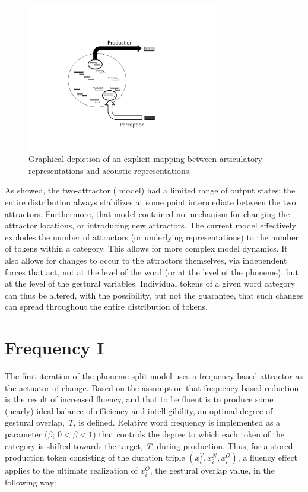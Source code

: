 \begin{figure}[H]

\includegraphics[width=0.75\textwidth]{figures/SeparateReps.pdf}\caption{\label{fig:P-toP-mapping}Graphical depiction of an explicit mapping
between articulatory representations and acoustic representations. }

\end{figure}

As  showed, the two-attractor (
model) had a limited range of output states: the entire distribution
always stabilizes at some point intermediate between the two attractors.
Furthermore, that model contained no mechanism for changing the attractor
locations, or introducing new attractors. The current model effectively
explodes the number of attractors (or underlying representations)
to the number of tokens within a category. This allows for more complex
model dynamics. It also allows for changes to occur to the attractors
themselves, via independent forces that act, not at the level of the
word (or at the level of the phoneme), but at the level of the gestural
variables. Individual tokens of a given word category can thus be
altered, with the possibility, but not the guarantee, that such changes
can spread throughout the entire distribution of tokens.

\section{\label{sec:Frequency-I}Frequency I}

The first iteration of the phoneme-split model uses a frequency-based
attractor as the actuator of change. Based on the assumption that
frequency-based reduction is the result of increased fluency, and
that to be fluent is to produce some (nearly) ideal balance of efficiency
and intelligibility, an optimal degree of gestural overlap, \emph{T},
is defined. Relative word frequency is implemented as a parameter
($\beta$; $0<\beta<1$) that controls the degree to which each token
of the category is shifted towards the target, \emph{T}, during production.
Thus, for a stored production token consisting of the duration triple
$(x_{i}^{V},x_{i}^{N},x_{i}^{O})$, a fluency effect applies to the
ultimate realization of $x_{i}^{O}$, the gestural overlap value,
in the following way: 

